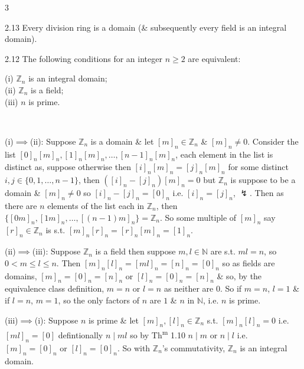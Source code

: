 \documentclass[8pt]{extarticle}
\makeatletter
\renewenvironment{proof}[1][\proofname]{%
  \begin{tcolorbox}[proofpairboxstyle]%
  \pushQED{\qed}%
  \normalfont\itshape #1\@addpunct{.}\ \normalfont\ignorespaces
}{%
  \popQED%
  \end{tcolorbox}%
}
\makeatother
\begin{document}
\begin{multicols*}{3}
        \begin{proposition}{2.13}
            Every division ring is a domain (\& subsequently every field is an integral domain).
        \end{proposition}

        \begin{lemma}{2.12}
            The following conditions for an integer \(n\ge2\) are equivalent:

            (i) \(\mathbb{Z}_n\) is an integral domain;\\
            (ii) \(\mathbb{Z}_n\) is a field;\\
            (iii) \(n\) is prime.
        \end{lemma}

        \begin{proof}
            (i)\(\implies\)(ii):
            Suppose \(\mathbb{Z}_n\) is a domain \& let \([m]_n\in\mathbb{Z}_n\) \& \([m]_n\ne0\). Consider the list \([0]_n[m]_n,[1]_n[m]_n,\ldots,[n-1]_n[m]_n\), each element in the list is distinct as, suppose otherwise then \([i]_n[m]_n=[j]_n[m]_n\) for some distinct \(i,j\in\{0,1,\ldots,n-1\}\), then \(([i]_n-[j]_n)[m]_n=0\) but \(\mathbb{Z}_n\) is suppose to be a domain \& \([m]_n\ne0\) so \([i]_n-[j]_n=[0]_n\) i.e. \([i]_n=[j]_n\), \(\lightning\). Then as there are \(n\) elements of the list each in \(\mathbb{Z}_n\), then \(\{[0m]_n,[1m]_n,\ldots,[(n-1)m]_n\}=\mathbb{Z}_n\). So some multiple of \([m]_n\) say \([r]_n\in\mathbb{Z}_n\) is s.t. \([m]_n[r]_n=[r]_n[m]_n=[1]_n\).

            (ii)\(\implies\)(iii):
            Suppose \(\mathbb{Z}_n\) is a field then suppose \(m,l\in\mathbb{N}\) are s.t. \(ml=n\), so \(0<m\le l\le n\). Then \([m]_n[l]_n=[ml]_n=[n]_n=[0]_n\) so as fields are domains, \([m]_n=[0]_n=[n]_n\) or \([l]_n=[0]_n=[n]_n\) \& so, by the equivalence class definition, \(m=n\) or \(l=n\) as neither are \(0\). So if \(m=n\), \(l=1\) \& if \(l=n\), \(m=1\), so the only factors of \(n\) are \(1\) \& \(n\) in \(\mathbb{N}\), i.e. \(n\) is prime.

            (iii)\(\implies\)(i):
            Suppose \(n\) is prime \& let \([m]_n,[l]_n\in\mathbb{Z}_n\) s.t. \([m]_n[l]_n=0\) i.e. \([ml]_n=[0]\) defintionally \(n\mid ml\) so by Th\textsuperscript{m} 1.10 \(n\mid m\) or \(n\mid l\) i.e. \([m]_n=[0]_n\) or \([l]_n=[0]_n\). So with \(\mathbb{Z}_n\)'s commutativity, \(\mathbb{Z}_n\) is an integral domain.
        \end{proof}


\end{multicols*}
\end{document}
